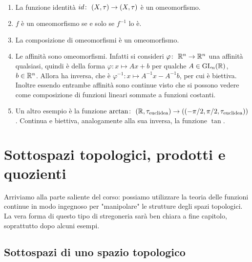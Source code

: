 \begin{example} \
\begin{enumerate}
	\item La funzione identità $id \colon\ (X,\tau) \rightarrow (X,\tau)$ è un omeomorfismo. 
	\item $f$ è un omeomorfismo se e solo se $f^{-1}$ lo è. 
	\item La composizione di omeomorfismi è un omeomorfismo.
	\item Le affinità sono omeomorfismi. Infatti si consideri $\varphi \colon\ \mathbb{R}^n \rightarrow \mathbb{R}^n$ una affinità qualsiasi, quindi è della forma $\varphi \colon x \mapsto Ax + b$ per qualche $A \in \operatorname{GL}_n(\mathbb{R})$, $b \in \mathbb{R}^n$. Allora ha inversa, che è $\varphi^{-1} \colon x \mapsto A^{-1}x - A^{-1}b$, per cui è biettiva. Inoltre essendo entrambe affinità sono continue visto che si possono vedere come composizione di funzioni lineari sommate a funzioni costanti.
	\item Un altro esempio è la funzione $\arctan \colon\ (\mathbb{R}, \tau_{\text{euclidea}}) \rightarrow ((-\pi/2,\pi/2, \tau_{\text{euclidea}}))$. Continua e biettiva, analogamente alla sua inversa, la funzione $\tan$.
\end{enumerate}
\end{example}



\section{Sottospazi topologici, prodotti e quozienti}
Arriviamo alla parte saliente del corso: possiamo utilizzare la teoria delle funzioni continue in modo ingegnoso per "manipolare" le strutture degli spazi topologici. \\ La vera forma di questo tipo di stregoneria sarà ben chiara a fine capitolo, soprattutto dopo alcuni esempi.
\subsection{\textcolor{TopGener}{\textbf{Sottospazi di uno spazio topologico}}}



